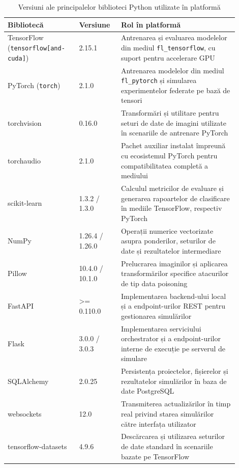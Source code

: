 \documentclass[../../main.tex]{subfiles}
\begin{document}
        \begin{table}[h!]
            \centering
            \footnotesize
            \begin{tabular}{|p{0.28\linewidth}|p{0.16\linewidth}|p{0.46\linewidth}|}
                \hline
                \textbf{Bibliotecă} & \textbf{Versiune} & \textbf{Rol în platformă} \\
                \hline
                TensorFlow (\texttt{tensorflow[and-cuda]}) & 2.15.1 & Antrenarea și evaluarea modelelor din mediul \texttt{fl\_tensorflow}, cu suport pentru accelerare GPU \\
                \hline
                PyTorch (\texttt{torch}) & 2.1.0 & Antrenarea modelelor din mediul \texttt{fl\_pytorch} și simularea experimentelor federate pe bază de tensori \\
                \hline
	                torchvision & 0.16.0 & Transformări și utilitare pentru seturi de date de imagini utilizate în scenariile de antrenare PyTorch \\
                \hline
                torchaudio & 2.1.0 & Pachet auxiliar instalat împreună cu ecosistemul PyTorch pentru compatibilitatea completă a mediului \\
                \hline
                scikit-learn & 1.3.2 / 1.3.0 & Calculul metricilor de evaluare și generarea rapoartelor de clasificare în mediile TensorFlow, respectiv PyTorch \\
                \hline
                NumPy & 1.26.4 / 1.26.0 & Operații numerice vectorizate asupra ponderilor, seturilor de date și rezultatelor intermediare \\
                \hline
                Pillow & 10.4.0 / 10.1.0 & Prelucrarea imaginilor și aplicarea transformărilor specifice atacurilor de tip data poisoning \\
                \hline
                FastAPI & >= 0.110.0 & Implementarea backend-ului local și a endpoint-urilor REST pentru gestionarea simulărilor \\
                \hline
                Flask & 3.0.0 / 3.0.3 & Implementarea serviciului orchestrator și a endpoint-urilor interne de execuție pe serverul de simulare \\
                \hline
                SQLAlchemy & 2.0.25 & Persistența proiectelor, fișierelor și rezultatelor simulărilor în baza de date PostgreSQL \\
                \hline
                websockets & 12.0 & Transmiterea actualizărilor în timp real privind starea simulărilor către interfața utilizator \\
                \hline
                tensorflow-datasets & 4.9.6 & Descărcarea și utilizarea seturilor de date standard în scenariile bazate pe TensorFlow \\
                \hline
            \end{tabular}
            \caption{Versiuni ale principalelor biblioteci Python utilizate în platformă}
            \label{tab:python_library_versions}
        \end{table}
\end{document}
